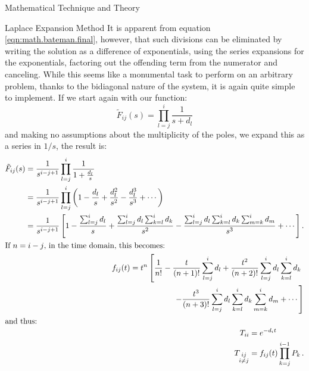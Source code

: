 \begin{chapter}{Mathematical Technique and Theory\label{chap:math}}
\begin{section}{Laplace Expansion Method}
    It is apparent from equation \ref{eqn:math.bateman.final},
    however, that such divisions can be eliminated by writing the
    solution as a difference of exponentials, using the series
    expansions for the exponentials, factoring out the offending term
    from the numerator and canceling.  While this seems like a
    monumental task to perform on an arbitrary problem, thanks to the
    bidiagonal nature of the system, it is again quite simple to
    implement.  If we start again with our function:
    \begin{equation}
      \tilde{F}_{ij}(s) = \prod_{l=j}^{i}\frac{1}{s+d_l}
    \end{equation}
    and making no assumptions about the multiplicity of the poles, we
    expand this as a series in $1/s$, the result is:
    \begin{align}
      \begin{split}
        \tilde{F}_{ij}(s) &=\frac{1}{s^{i-j+1}} \prod_{l=j}^i\frac{1}{1+\frac{d_l}{s}}\\
        &=\frac{1}{s^{i-j+1}} \prod_{l=j}^i 
        \left(1 - \frac{d_l}{s} + \frac{d_l^2}{s^2} - \frac{d_l^3}{s^3} + \cdots \right )\\
        &= \frac{1}{s^{i-j+1}} \left [ 1 - \frac{\sum_{l=j}^i d_l}{s} +
          \frac{\sum_{l=j}^{i}d_l\sum_{k=l}^i d_k}{s^2} - 
          \frac{\sum_{l=j}^{i}d_l \sum_{k=l}^i d_k \sum_{m=k}^i d_m}{s^3} + \cdots
        \right ].
      \end{split}\\
      \intertext{If $n=i-j$, in the time domain, this becomes:}
      \begin{split}
        f_{ij}(t) &= t^{n} \left[ \frac{1}{n!} - \frac{t}{(n+1)!}\sum_{l=j}^i d_l 
          +\frac{t^2}{(n+2)!}\sum_{l=j}^{i}d_l \sum_{k=l}^i d_k\right.\\  
        &\phantom{= t^{n-1} \left[\right.}
        \left.\quad\quad-\frac{t^3}{(n+3)!}\sum_{l=j}^{i}d_l \sum_{k=l}^i d_k \sum_{m=k}^i d_m 
          +\cdots \right ]\label{eqn:math.expansion.final}\\
      \end{split}\\
      \intertext{and thus:}
      \begin{split}
        T_{ii} &= e^{-d_i t}\\
        T_{\substack{ij\\i\neq j}} &= f_{ij}(t)\prod_{k=j}^{i-1}P_k \, .\\
      \end{split}
    \end{align}
    

\end{section}
\end{chapter}
